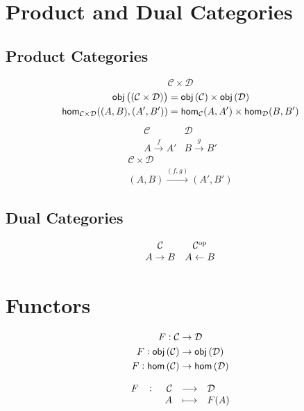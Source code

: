 \documentclass[11pt,openany]{article}
\newcommand{\from}{\leftarrow}
\begin{document}
\vfill
\section{Product and Dual Categories}

\subsection{Product Categories}
\[
\mathcal{C}\times\mathcal{D}
\]
\begin{align*}
\mathsf{obj}\left((\mathcal{C}\times\mathcal{D})\right)&=\mathsf{obj}\left(\mathcal{C}\right)\times\mathsf{obj}\left(\mathcal{D}\right)\\
\mathsf{hom}_{\mathcal{C}\times\mathcal{D}}((A,B),(A',B'))&=\mathsf{hom}_{\mathcal{C}}(A,A')\times\mathsf{hom}_{\mathcal{D}}(B,B')
\end{align*}
\[\begin{array}{cc}
	\mathcal{C} &\mathcal{D} \\ A\xrightarrow{f}A' & B\xrightarrow{g}B'
\end{array}\]
\[\begin{array}{c}
	\mathcal{C} \times\mathcal{D} \\ (A,B)\xrightarrow{(f,g)}(A',B')
\end{array}\]

\subsection{Dual Categories}
\[\begin{array}{cc}
	\category & \mathcal{C}^\op \\ A\to B & A\from B
\end{array}\]

\newpage
\section{Functors}
\begin{align*}
	F:\mathcal{C}&\to\mathcal{D}\\
	F:\mathsf{obj}\left(\mathcal{C}\right)&\to\mathsf{obj}\left(\mathcal{D}\right)\\
	F:\mathsf{hom}\left(\mathcal{C}\right)&\to\mathsf{hom}\left(\mathcal{D}\right)\\
\end{align*}

\[
\fullfunction{F}{\category}{\mathcal{D}}{A}{F(A)}
\]
\end{document}
